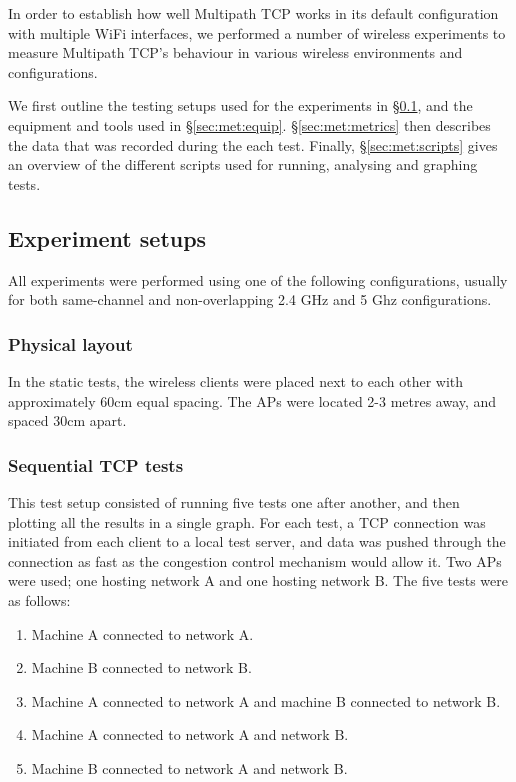 In order to establish how well Multipath TCP works in its default configuration
with multiple WiFi interfaces, we performed a number of wireless experiments to
measure Multipath TCP's behaviour in various wireless environments and configurations.

We first outline the testing setups used for the experiments in
\S\ref{sec:met:setups}, and the equipment and tools used in
\S\ref{sec:met:equip}. \S\ref{sec:met:metrics} then describes the
data that was recorded during the each test. Finally,
\S\ref{sec:met:scripts} gives an overview of the different scripts used
for running, analysing and graphing tests.

\subsection{Experiment setups}
\label{sec:met:setups}
All experiments were performed using one of the following configurations, usually
for both same-channel and non-overlapping 2.4 GHz and 5 Ghz configurations.

\subsubsection{Physical layout}
In the static tests, the wireless clients were placed next to each other with approximately 60cm equal spacing. The
APs were located 2-3 metres away, and spaced 30cm apart.

\subsubsection{Sequential TCP tests}
\label{sec:met:setups:seqtcp}
This test setup consisted of running five tests one after another, and then
plotting all the results in a single graph. For each test, a TCP connection was
initiated from each client to a local test server, and data was pushed through the
connection as fast as the congestion control mechanism would allow it. Two APs
were used; one hosting network A and one hosting network B. The five tests were
as follows:

\begin{enumerate}
  \item Machine A connected to network A.
  \item Machine B connected to network B.
  \item Machine A connected to network A and machine B connected to network B.
  \item Machine A connected to network A and network B.
  \item Machine B connected to network A and network B.
\end{enumerate}

